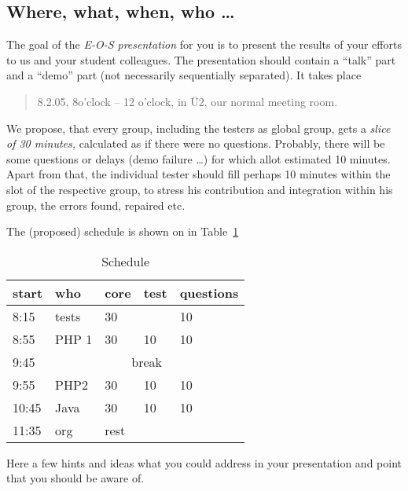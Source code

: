 \subsection*{Where, what, when, who \ldots}

The goal of the \emph{E-O-S presentation} for you is to present the results
of your efforts to us and your student colleagues. The presentation should
contain a ``talk'' part and a ``demo'' part (not necessarily sequentially
separated). It takes place
\begin{quotation}
  8.2.05, 8o'clock -- 12 o'clock, in {\"U}2, our normal meeting room.
\end{quotation}

We propose, that every group, including the testers as global group, gets a
\emph{slice of 30 minutes,} calculated as if there were no questions.
Probably, there will be some questions or delays (demo failure \ldots) for
which allot estimated 10 minutes. Apart from that, the individual tester
should fill perhaps 10 minutes within the slot of the respective group, to
stress his contribution and integration within his group, the errors
found, repaired etc.

The (proposed) schedule is shown on in Table~\ref{tab:schedule}



\begin{table}[htbp]
  \centering
  \begin{tabular}[t]{l|llll}
    start &  who & core &  test & questions
    \\\hline
    8:15 & tests & 30 & & 10
    \\
    8:55 & PHP 1 & 30 & 10 &10
    \\
    9:45 & \multicolumn{4}{c}{break}
    \\
    9:55 & PHP2 & 30 &10 &10
    \\
    10:45 & Java & 30 & 10 & 10
    \\
    11:35 & org & rest
  \end{tabular}
  \caption{Schedule}
  \label{tab:schedule}
\end{table}




Here a few hints and ideas what you could address in your presentation and
point that you should be aware of.

